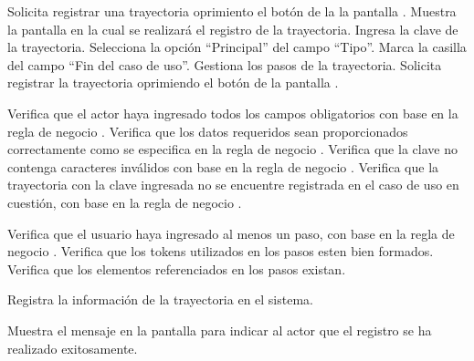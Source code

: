  \begin{UCtrayectoria}
	\UCpaso[\UCactor] Solicita registrar una trayectoria oprimiento el botón  de la la pantalla . 
	\UCpaso[\UCsist] Muestra la pantalla  en la cual se realizará el registro de la trayectoria.
	\UCpaso[\UCactor] Ingresa la clave de la trayectoria.
	\UCpaso[\UCactor] Selecciona la opción ``Principal'' del campo ``Tipo''.  \label{cu5.1.1.1:ingresaDatos}
	\UCpaso[\UCsist] Marca la casilla del campo ``Fin del caso de uso''.
	\UCpaso[\UCactor] Gestiona los pasos de la trayectoria. \label{cu5.1.1.1:gestionaPasos}
	\UCpaso[\UCactor] Solicita registrar la trayectoria oprimiendo el botón  de la pantalla .  
	
	\UCpaso[\UCsist] Verifica que el actor haya ingresado todos los campos obligatorios con base en la regla de negocio . 
	\UCpaso[\UCsist] Verifica que los datos requeridos sean proporcionados correctamente como se especifica en la regla de negocio .  
	\UCpaso[\UCsist] Verifica que la clave no contenga caracteres inválidos con base en la regla de negocio . 
	\UCpaso[\UCsist] Verifica que la trayectoria con la clave ingresada no se encuentre registrada en el caso de uso en cuestión, con base en la regla de negocio . 
	
	\UCpaso[\UCsist] Verifica que el usuario haya ingresado al menos un paso, con base en la regla de negocio . 
	\UCpaso[\UCsist] Verifica que los tokens utilizados en los pasos esten bien formados. 
	\UCpaso[\UCsist] Verifica que los elementos referenciados en los pasos existan. 
	
	\UCpaso[\UCsist] Registra la información de la trayectoria en el sistema.
	
	\UCpaso[\UCsist] Muestra el mensaje  en la pantalla  
	para indicar al actor que el registro se ha realizado exitosamente.
    
\end{UCtrayectoria}
